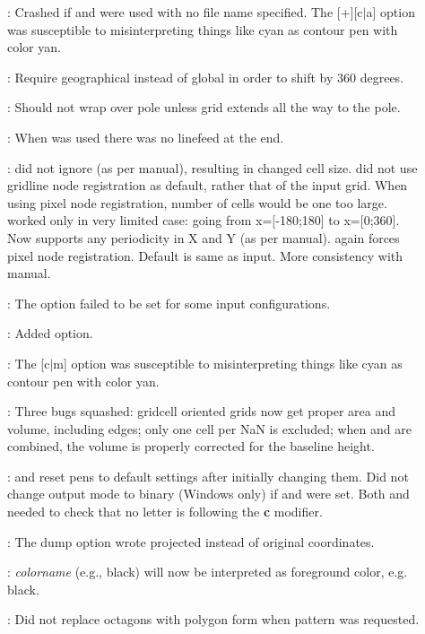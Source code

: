 \begin{description}
\item []: Crashed if  and  were used with no file name specified.
The [+][c$|$a] option was susceptible to misinterpreting things like cyan as contour pen with color yan.
\item []: Require geographical instead of global in order to shift by 360 degrees.
\item []: Should not wrap over pole unless grid extends all the way to the pole.
\item []: When  was used there was no linefeed at the end.
\item []:  did not ignore  (as per manual), resulting in changed cell size.
 did not use gridline node registration as default, rather that of the input grid.
When using pixel node registration, number of cells would be one too large.
 worked only in very limited case: going from x=[-180;180] to x=[0;360].
Now supports any periodicity in X and Y (as per manual).  again forces pixel node registration.
Default is same as input.  More consistency with manual.
\item []: The  option failed to be set for some input configurations.
\item []: Added  option.
\item []: The [c$|$m] option was susceptible to misinterpreting things like cyan as contour pen with color yan.
\item []: Three bugs squashed: gridcell oriented grids now get proper area and volume,
including edges; only one cell per NaN is excluded; when  and  are combined,
the volume is properly corrected for the baseline height.
\item []:  and  reset pens to default settings after initially changing them.
Did not change output mode to binary (Windows only) if  and  were set.
Both  and  needed to check that no letter is following the \textbf{c} modifier.
\item []: The  dump option wrote projected instead of original coordinates.
\item []: \emph{colorname} (e.g., black) will now be interpreted as foreground color, e.g. black.
\item []: Did not replace octagons with polygon form when pattern was requested.

\end{description}

